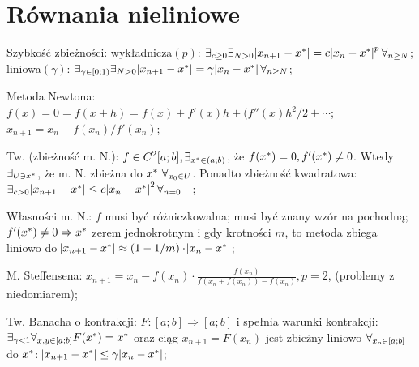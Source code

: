 \section{Równania nieliniowe}



\entry
Szybkość zbieżności:
wykładnicza$(p)$:
$\exists_{c \geq 0} \exists_{N > 0}
\abs{x_{n + 1} - x^{*}} = c \abs{x_n - x^{*}}^p \forall_{n \geq N}$;
liniowa$(\gamma)$:
$\exists_{\gamma \in [0;1)} \exists_{N > 0}
\abs{x_{n + 1} - x^{*}} = \gamma \abs{x_n - x^{*}} \forall_{n \geq N}$;

\entry
Metoda Newtona:
$f(x) = 0 = f(x+h) = f(x) + f'(x)h + (f''(x)h^2/2+\cdots$;
$x_{n+1} = x_n - f(x_n)/f'(x_n)$;

\entry
Tw. (zbieżność m. N.):
$f \in C^2[a;b], \exists_{x^{*} \in (a;b)}$,
że $f(x^{*})=0, f'(x^{*}) \neq 0$.
Wtedy $\exists_{U \ni x^{*}}$, że m. N. zbieżna do $x^{*} \ \forall_{x_0 \in U}$.
Ponadto zbieżność kwadratowa:
$\exists_{c>0} \abs{x_{n+1} - x^{*}} \leq c \abs{x_n - x^{*}}^2 \forall_{n=0,\ldots}$;

\entry
Własności m. N.:
\subentry
$f$ musi być różniczkowalna;
\subentry
musi być znany wzór na pochodną;
\subentry
$f'(x^{*}) \neq 0 \Rightarrow x^{*}$ zerem jednokrotnym i gdy krotności $m$, 
to metoda zbiega liniowo do 
$\abs{x_{n+1} - x^{*}} \approx (1-1/m) \cdot \abs{x_n - x^{*}}$;



\entry
M. Steffensena:
$x_{n+1} = x_n - f(x_n) \cdot \frac{f(x_n)}{f(x_n + f(x_n)) - f(x_n)}, p=2$,
(problemy z niedomiarem);




\entry
Tw. Banacha o kontrakcji:
$F:[a;b] \Rightarrow [a;b]$
i spełnia warunki kontrakcji:
$\exists_{\gamma < 1} \forall_{x,y \in [a;b]} F(x^{*}) = x^{*}$
oraz ciąg 
$x_{n+1} = F(x_n)$ 
jest zbieżny liniowo 
$\forall_{x_o \in [a;b]}$
do $x^{*}$:
$\abs{x_{n+1} - x^{*}} \leq \gamma \abs{x_n - x^{*}}$;
